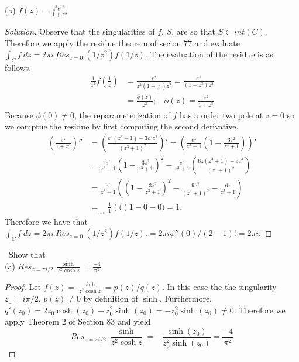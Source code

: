 \documentclass[11pt]{amsart}
\theoremstyle{definition}
\numberwithin{theorem}{section}
\numberwithin{definition}{section}
\numberwithin{equation}{section}
\newenvironment{solution}
  {\begin{proof}[Solution]}
  {\end{proof}}
\newcommand{\parens}[1]{ \left( #1 \right) }
\begin{document}
(b) $f(z) = \frac{z^3 e^{1/z}}{1+z^3}$
\begin{solution}
		Observe that the singularities of $f$, $S$, are so that $S \subset int(C).$ Therefore we apply the residue theorem of secion $77$ and evaluate $\int_C f\ dz = 2\pi i \ Res_{z=0}\ (1/z^2)f(1/z).$ The evaluation of the residue is as follows.
	\begin{equation*}
	\begin{aligned}
		\frac{1}{z^2}f\left(\frac{1}{z}\right) &= \frac{e^z}{z^3\parens{1 + \frac{1}{z^3}}z^2} = \frac{e^z}{(1 + z^3)z^2} \\
		&= \frac{\phi(z)}{z^2};\;\;\;\phi(z) = \frac{e^z}{1 + z^3} 
	\end{aligned}
	\end{equation*}
	Because $\phi(0) \neq 0$, the reparameterization of $f$ has a order two pole at $z = 0$ so we comptue the residue by first computing the second derivative.
	\begin{equation*}
		\begin{aligned}
			\parens{\frac{e^z}{1 + z^3}}'' &= \parens{\frac{e^z(z^3 +1) - 3e^zz^2}{(z^3 + 1)^2}}' = \parens{\frac{e^z}{z^3 + 1}\parens{1 - \frac{3z^2}{z^3 + 1}}}'\\
			&= \frac{e^z}{z^3 + 1}\parens{1 - \frac{3z^2}{z^3 + 1}}^2 - \frac{e^z}{z^3 + 1}\parens{\frac{6z(z^3+1) - 9z^4}{(z^3 + 1)^2}} \\
			&= \frac{e^z}{z^3 + 1}\parens{\parens{1 - \frac{3z^2}{z^3 + 1}}^2 -\frac{9z^2}{(z^3 + 1)^2} - \frac{6z}{z^3 + 1}  } \\
			&=_{_{_{z=0}}} \frac{1}{1}\parens(1 - 0 - 0) = 1.
		\end{aligned}
	\end{equation*}
	Therefore we have that 
	$\int_C f\ dz = 2\pi i \ Res_{z=0}\ (1/z^2)f(1/z). = 2\pi i \phi''(0)/(2-1)! = 2\pi i.$
\end{solution}
\medskip {}\ Show that \\
(a) $Res_{z = \pi i/2}\ \frac{\sinh}{z^2 \cosh z} = \frac{-4}{\pi^2}.$
\begin{proof}
	Let $f(z) = \frac{\sinh}{z^2 \cosh z} = p(z)/q(z).$ In this case the the singularity $z_0 = i\pi /2$, 
	$p(z) \neq 0$ by definition of $\sinh.$ Furthermore, $q'(z_0) = 2z_0\cosh(z_0)   -z_0^2 \sinh(z_0) = -z_0^2 \sinh(z_0) \neq 0$. Therefore we apply Theorem $2$ of Section $83$ and yield
	\begin{equation*}
		Res_{z = \pi i/2}\ \frac{\sinh}{z^2 \cosh z} = -\frac{\sinh(z_0)}{z_0^2 \sinh(z_0)} = \frac{-4}{\pi^2}
	\end{equation*}
\end{proof}
\end{document}
